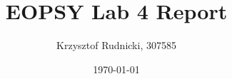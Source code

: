 \documentclass{article}
\begin{document}
\title{EOPSY Lab 4 Report}
\author{Krzysztof Rudnicki, 307585}
\date{\today}
\maketitle
	
	
	
\end{document}
